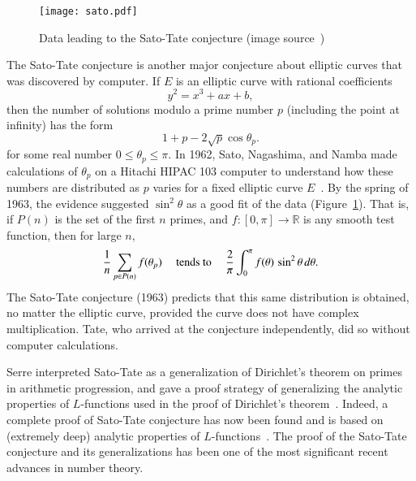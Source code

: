 \documentclass{llncs}
\newcommand{\ring}[1]{\mathbb{#1}}
\begin{document}

\begin{figure}[h!]
  \centering
\texttt{[image: sato.pdf]}
  \caption{Data leading to the Sato-Tate conjecture (image source~\cite{ST2})}
\label{fig:st}
\end{figure}



The Sato-Tate conjecture is another major conjecture about elliptic
curves that was discovered by computer.  If $E$ is an elliptic curve
with rational coefficients
\[
y^2 = x^3 + a x + b,
\]
then the number of solutions modulo a prime number $p$ (including the
point at infinity) has the form
\[
1 + p - 2\sqrt{p}\cos\theta_p.
\]
for some real number $0\le \theta_p\le \pi$.  In 1962, Sato,
Nagashima, and Namba made calculations  of $\theta_p$ on a Hitachi
HIPAC 103 computer to understand how these numbers are distributed as
$p$ varies for a fixed elliptic curve $E$~\cite{Sch}.  By the spring of 1963, the
evidence suggested  $\sin^2\theta$ as a good fit of the data (Figure~\ref{fig:st}).
That is, if $P(n)$ is the set of the first $n$ primes, and
$f:[0,\pi]\to\ring{R}$ is any smooth test function, then for large
$n$,
\[
\frac{1}{n}\sum_{p\in P(n)} f(\theta_p) \quad\hbox{ tends to }\quad
\frac{2}{\pi}\int_0^\pi f(\theta)\,\sin^2\theta\,d\theta.
\]
The Sato-Tate conjecture (1963) predicts that this same distribution is
obtained, no matter the elliptic curve, provided the curve does not
have complex multiplication.  Tate, who arrived at the conjecture
independently, did so without computer calculations.

Serre interpreted Sato-Tate as a generalization of Dirichlet's theorem
on primes in arithmetic progression, and gave a proof strategy of
generalizing the analytic properties of $L$-functions used in the
proof of Dirichlet's theorem~\cite{Se68}.  Indeed, a complete proof of
Sato-Tate conjecture has now been found and is based on (extremely
deep) analytic properties of $L$-functions~\cite{Car:Bourbaki}.  The
proof of the Sato-Tate conjecture and its generalizations has been one
of the most significant recent advances in number theory.
\end{document}
